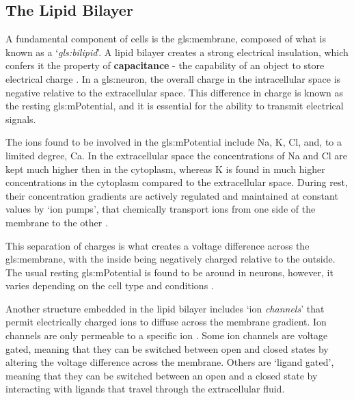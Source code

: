 \documentclass[../../Orator]{subfiles}
\begin{document}
\subsection{The Lipid Bilayer} 
A fundamental component of cells is the \gls{gls:membrane}, composed of what is known as a `\textit{\gls{gls:bilipid}}'\footnotemark. A lipid bilayer creates a strong electrical insulation, 
which confers it the property of \textbf{capacitance} - the capability of an object to store electrical charge \cite{}.  
In a \gls{gls:neuron}, the overall charge in the intracellular space is negative relative to the extracellular space. 
This difference in charge is known as the resting \gls{gls:mPotential}, and it is essential for the  ability to transmit electrical signals. 

The ions found to be involved in the \gls{gls:mPotential} include \gls{Na}, \gls{K}, \gls{Cl}, and, to a limited degree, \gls{Ca}. 
In the extracellular space the concentrations of \gls{Na} and  \gls{Cl} are kept much higher then in the cytoplasm, whereas \gls{K} is found in much higher concentrations  in the cytoplasm compared to the extracellular space. During rest, their concentration gradients are actively regulated and maintained at constant values by `ion pumps', that chemically transport ions from one side of the membrane to the other \cite{}. 

This separation of charges is what creates a voltage difference across the \gls{gls:membrane}, with the inside being negatively charged relative to the outside. The usual resting \gls{gls:mPotential} is found to be around  in neurons, however, it varies depending on the cell type and conditions \cite{}. 

Another structure embedded in the lipid bilayer includes `ion \textit{channels}' that permit electrically charged ions to diffuse across the membrane gradient. Ion channels are only permeable to a specific ion \cite{}. Some ion channels are voltage gated, meaning that they can be switched between open and closed states by altering the voltage difference across the membrane. 
Others are `ligand gated', meaning that they can be switched between an open and a closed state by interacting with ligands that travel through the extracellular fluid. 

\vspace{1em}
\end{document}
